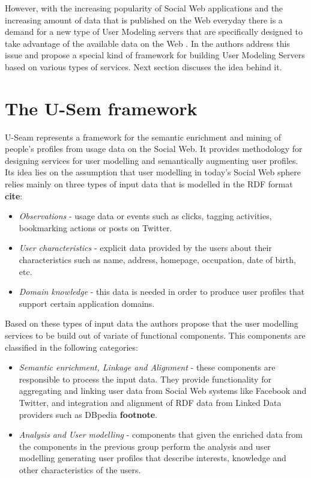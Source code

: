 However, with the increasing popularity of Social Web applications and the increasing amount of data that is published on the Web everyday there is a demand for a new type of User Modeling servers that are specifically designed to take advantage of the available data on the Web \cite{Kobsa07}. In \cite{Fabian} the authors address this issue and propose a special kind of framework for building User Modeling Servers based on various types of services. Next section discuses the idea behind it.

\section{The U-Sem framework}
U-Seam represents a framework for the semantic enrichment and mining of people's profiles from usage data on the Social Web. It provides methodology for designing services for user modelling and semantically augmenting user profiles. Its idea lies on the assumption that user modelling in today's Social Web sphere relies mainly on three types of input data \cite{Fabian} that is modelled in the RDF format \textbf{cite}:

\begin{itemize}
	\item \textit{Observations} - usage data or events such as clicks, tagging activities, bookmarking actions or posts on Twitter.
	
	\item \textit{User characteristics} - explicit data provided by the users about their characteristics such as name, address, homepage, occupation, date of birth, etc.
	
	\item \textit{Domain knowledge} - this data is needed in order to produce user profiles that support certain application domains.
\end{itemize}

Based on these types of input data the authors propose that the user modelling services to be build out of variate of functional components. This components are classified in the following categories:

\begin{itemize}
	\item \textit{Semantic enrichment, Linkage and Alignment} - these components are responsible to process the input data. They provide functionality for aggregating and linking user data from Social Web systems like Facebook and Twitter, and integration and alignment of RDF data from Linked Data providers such as DBpedia \textbf{footnote}.
	
	\item \textit{Analysis and User modelling} - components that given the enriched data from the components in the previous group perform the analysis and user modelling generating user profiles that describe interests, knowledge and other characteristics of the users.
\end{itemize}

